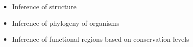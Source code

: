 \documentclass[landscape]{slides}
\begin{document}
\begin{slide}
\begin{slide}
\end{slide}

\begin{slide}


\begin{itemize}
\item Inference of  structure
\item Inference of phylogeny of organisms
\item Inference of functional regions based on conservation levels
\end{itemize}


\end{slide}
\end{slide}
\end{document}
